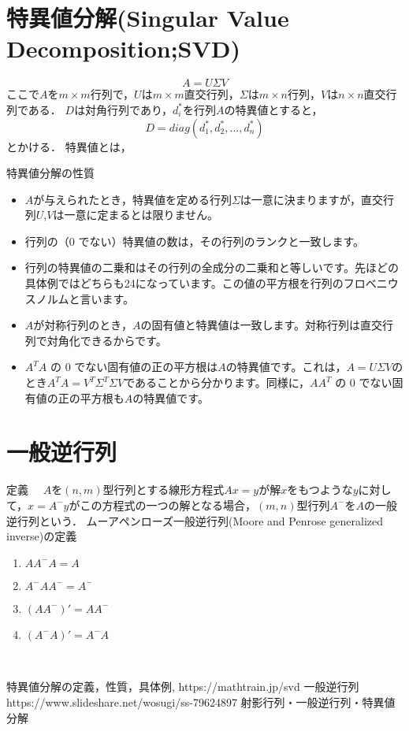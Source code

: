 \documentclass[12pt]{jsarticle}
\begin{document}
\section{特異値分解(Singular Value Decomposition;SVD)}
\begin{equation}
  \label{A=USV}
  A = U \Sigma V
\end{equation}
ここで$A$を$m×m$行列で，$U$は$m×m$直交行列，$\Sigma$は$m×n$行列，$V$は$n×n$直交行列である．
$D$は対角行列であり，$d_i^*$を行列$A$の特異値とすると，
\begin{equation}
  \label{D_diag}
  D = diag(d_1^*, d_2^*, ..., d_n^*)
\end{equation}
とかける．
特異値とは，

特異値分解の性質
\begin{itemize}
  \item $A$が与えられたとき，特異値を定める行列$Σ$は一意に決まりますが，直交行列$U$,$V$は一意に定まるとは限りません。
  \item 行列の（0 でない）特異値の数は，その行列のランクと一致します。
  \item 行列の特異値の二乗和はその行列の全成分の二乗和と等しいです。先ほどの具体例ではどちらも24になっています。この値の平方根を行列のフロベニウスノルムと言います。
  \item $A$が対称行列のとき，$A$の固有値と特異値は一致します。対称行列は直交行列で対角化できるからです。
  \item $A^TA$ の 0 でない固有値の正の平方根は$A$の特異値です。これは，$A=UΣV$のとき$A^TA=V^TΣ^TΣV$であることから分かります。同様に，$AA^T$ の 0 でない固有値の正の平方根も$A$の特異値です。
\end{itemize}

\section{一般逆行列}

定義
　$A$を$(n,m)$型行列とする線形方程式$Ax=y$が解$x$をもつような$y$に対して，$x=A^-y$がこの方程式の一つの解となる場合，$(m,n)$型行列$A^-$を$A$の一般逆行列という．
ムーアペンローズ一般逆行列(Moore and Penrose generalized inverse)の定義
\begin{enumerate}
  \item $AA^-A = A$
  \item $A^-AA^- = A^-$
  \item $(A A^-)' = AA^-$
  \item $(A^- A)' = A^-A$
\end{enumerate}
　

\begin{thebibliography}{9}
   特異値分解の定義，性質，具体例, https://mathtrain.jp/svd
  \bibitem{} 一般逆行列 https://www.slideshare.net/wosugi/ss-79624897
  \bibitem{} 射影行列・一般逆行列・特異値分解 
\end{thebibliography}
\end{document}
